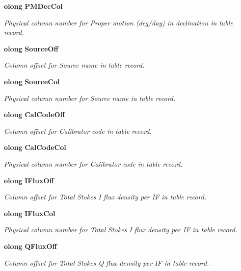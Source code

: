 \begin{CompactItemize}
{\bf olong} {\bf PMDec\-Col}
\begin{CompactList}\small\item\em Physical column number for Proper motion (deg/day) in declination in table record. \item\end{CompactList}\item 
{\bf olong} {\bf Source\-Off}
\begin{CompactList}\small\item\em Column offset for Source name in table record. \item\end{CompactList}\item 
{\bf olong} {\bf Source\-Col}
\begin{CompactList}\small\item\em Physical column number for Source name in table record. \item\end{CompactList}\item 
{\bf olong} {\bf Cal\-Code\-Off}
\begin{CompactList}\small\item\em Column offset for Calibrator code in table record. \item\end{CompactList}\item 
{\bf olong} {\bf Cal\-Code\-Col}
\begin{CompactList}\small\item\em Physical column number for Calibrator code in table record. \item\end{CompactList}\item 
{\bf olong} {\bf IFlux\-Off}
\begin{CompactList}\small\item\em Column offset for Total Stokes I flux density per IF in table record. \item\end{CompactList}\item 
{\bf olong} {\bf IFlux\-Col}
\begin{CompactList}\small\item\em Physical column number for Total Stokes I flux density per IF in table record. \item\end{CompactList}\item 
{\bf olong} {\bf QFlux\-Off}
\begin{CompactList}\small\item\em Column offset for Total Stokes Q flux density per IF in table record. \item\end{CompactList}\item 

\end{CompactItemize}
